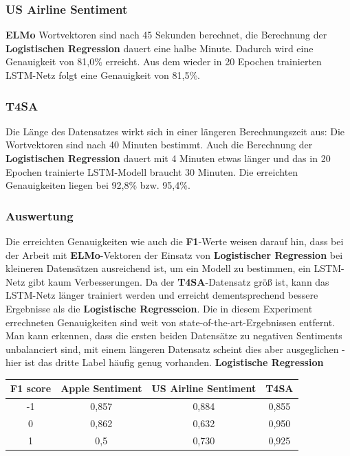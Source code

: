 \subsubsection*{US Airline Sentiment}
\textbf{ELMo} Wortvektoren sind nach 45 Sekunden berechnet, die Berechnung der \textbf{Logistischen Regression} dauert eine halbe Minute. Dadurch wird eine Genauigkeit von 81,0\% erreicht.  Aus dem wieder in 20 Epochen trainierten LSTM-Netz folgt eine Genauigkeit von 81,5\%.

\subsubsection*{T4SA}
Die L\"ange des Datensatzes wirkt sich in einer l\"angeren Berechnungszeit aus: Die Wortvektoren sind nach 40 Minuten bestimmt. Auch die Berechnung der \textbf{Logistischen Regression} dauert mit 4 Minuten etwas l\"anger und das in 20 Epochen trainierte LSTM-Modell braucht 30 Minuten. Die erreichten Genauigkeiten liegen bei 92,8\% bzw. 95,4\%.

\subsubsection*{Auswertung}
Die erreichten Genauigkeiten wie auch die \textbf{F1}-Werte weisen darauf hin, dass bei der Arbeit mit \textbf{ELMo}-Vektoren der Einsatz von \textbf{Logistischer Regression} bei kleineren Datens\"atzen ausreichend ist, um ein Modell zu bestimmen, ein LSTM-Netz gibt kaum Verbesserungen. Da der \textbf{T4SA}-Datensatz gr\"o{\ss} ist, kann das LSTM-Netz l\"anger trainiert werden und erreicht dementsprechend bessere Ergebnisse als die \textbf{Logistische Regresseion}. Die in diesem Experiment errechneten Genauigkeiten sind weit von state-of-the-art-Ergebnissen entfernt.\\
Man kann erkennen, dass die ersten beiden Datens\"atze zu negativen Sentiments unbalanciert sind, mit einem l\"angeren Datensatz scheint dies aber ausgeglichen - hier ist das dritte Label h\"aufig genug vorhanden.
\textbf{Logistische Regression}
\begin{center}
\begin{tabular}{|c||c|c|c|}
\hline
F1 score & Apple Sentiment & US Airline Sentiment & T4SA\\ 
\hline\hline
-1 & 0,857 & 0,884 & 0,855\\
\hline
0 & 0,862 & 0,632 & 0,950\\ 
\hline
1 & 0,5 & 0,730 & 0,925\\
\hline    
\end{tabular}
\end{center}

